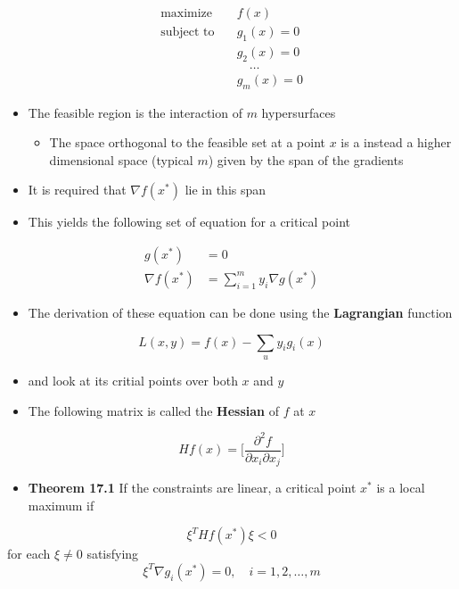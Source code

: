 \documentclass[11pt]{article}
\begin{document}
\begin{align*}
 	\text{maximize} & \quad f(x) \\
  \text{subject to} & \quad g_1(x) = 0 \\
                    & \quad g_2(x) = 0 \\
                    & \quad \quad \dots \\
                    & \quad g_m(x) = 0
\end{align*}
\begin{itemize}
\item The feasible region is the interaction of \(m\) hypersurfaces
\begin{itemize}
\item The space orthogonal to the feasible set at a point \(x\) is a instead a higher dimensional space (typical \(m\)) given by the span of the gradients
\end{itemize}
\item It is required that \(\nabla f(x^*)\) lie in this span
\item This yields the following set of equation for a critical point
\end{itemize}
\begin{align*}
  g(x^*) &= 0 \\
  \nabla f(x^*) &= \sum_{i=1}^m y_i \nabla g(x^*)
\end{align*}

\begin{itemize}
\item The derivation of these equation can be done using the \textbf{Lagrangian} function
\end{itemize}
\begin{equation}
  L(x,y) = f(x) - \sum_u y_i g_i(x)
\end{equation}
\begin{itemize}
\item and look at its critial points over both \(x\) and \(y\)
\end{itemize}


\begin{itemize}
\item The following matrix is called the \textbf{Hessian} of \(f\) at \(x\)
\end{itemize}
\begin{equation}
	 H f(x) = \bigg[ \frac{\partial ^ 2 f}{\partial x_i \partial x_j} \bigg] 
\end{equation}
\begin{itemize}
\item \textbf{Theorem 17.1} If the constraints are linear, a critical point \(x^*\) is	a local maximum if
\end{itemize}
\begin{equation}
  \xi^T H f(x^*) \xi < 0
\end{equation}
for each \(\xi \ne 0\) satisfying
\begin{equation*}
	\xi^T \nabla g_i(x^*) = 0, \quad i =1,2,\dots,m 
\end{equation*}	
\end{document}
